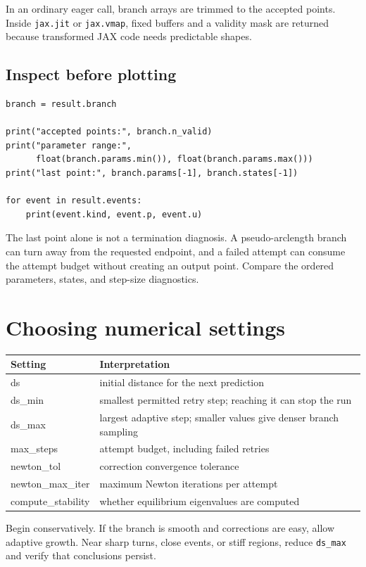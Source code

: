 \documentclass[11pt,oneside]{book}
\begin{document}
In an ordinary eager call, branch arrays are trimmed to the accepted points.
Inside \texttt{jax.jit} or \texttt{jax.vmap}, fixed buffers and a validity mask
are returned because transformed JAX code needs predictable shapes.

\subsection{Inspect before plotting}

\begin{lstlisting}
branch = result.branch

print("accepted points:", branch.n_valid)
print("parameter range:",
      float(branch.params.min()), float(branch.params.max()))
print("last point:", branch.params[-1], branch.states[-1])

for event in result.events:
    print(event.kind, event.p, event.u)
\end{lstlisting}

The last point alone is not a termination diagnosis. A pseudo-arclength branch
can turn away from the requested endpoint, and a failed attempt can consume the
attempt budget without creating an output point. Compare the ordered
parameters, states, and step-size diagnostics.

\section{Choosing numerical settings}

\begin{tabularx}{\textwidth}{>{\ttfamily}p{}X}
\toprule
\normalfont Setting & Interpretation\\
\midrule
ds & initial distance for the next prediction\\
ds\_min & smallest permitted retry step; reaching it can stop the run\\
ds\_max & largest adaptive step; smaller values give denser branch sampling\\
max\_steps & attempt budget, including failed retries\\
newton\_tol & correction convergence tolerance\\
newton\_max\_iter & maximum Newton iterations per attempt\\
compute\_stability & whether equilibrium eigenvalues are computed\\
\bottomrule
\end{tabularx}

Begin conservatively. If the branch is smooth and corrections are easy, allow
adaptive growth. Near sharp turns, close events, or stiff regions, reduce
\texttt{ds\_max} and verify that conclusions persist.
\end{document}
